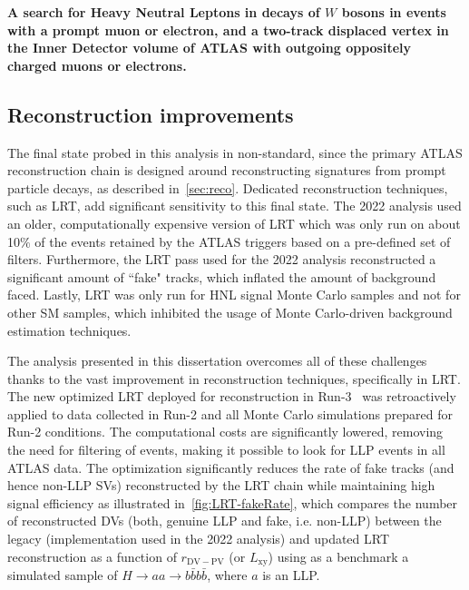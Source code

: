 \textbf{A search for Heavy Neutral Leptons in decays of $W$ bosons in events with a prompt muon or electron, and a two-track displaced vertex in the Inner Detector volume of ATLAS with outgoing oppositely charged muons or electrons.}

\subsection{Reconstruction improvements}
The final state probed in this analysis in non-standard, since the primary ATLAS reconstruction chain is designed around reconstructing signatures from prompt particle decays, as described in~\cref{sec:reco}. Dedicated reconstruction techniques, such as LRT, add significant sensitivity to this final state. The 2022 analysis used an older, computationally expensive version of LRT which was only run on about 10$\%$ of the events retained by the ATLAS triggers based on a pre-defined set of filters. Furthermore, the LRT pass used for the 2022 analysis reconstructed a significant amount of ``fake" tracks, which inflated the amount of background faced. Lastly, LRT was only run for HNL signal Monte Carlo samples and not for other SM samples, which inhibited the usage of Monte Carlo-driven background estimation techniques. 

The analysis presented in this dissertation overcomes all of these challenges thanks to the vast improvement in reconstruction techniques, specifically in LRT. The new optimized LRT deployed for reconstruction in Run-3~\cite{IDTR-2021-03} was retroactively applied to data collected in Run-2 and all Monte Carlo simulations prepared for Run-2 conditions. The computational costs are significantly lowered, removing the need for filtering of events, making it possible to look for LLP events in all ATLAS data. The optimization significantly reduces the rate of fake tracks (and hence non-LLP SVs) reconstructed by the LRT chain while maintaining high signal efficiency as illustrated in~\cref{fig:LRT-fakeRate}, which compares the number of reconstructed DVs (both, genuine LLP and fake, i.e. non-LLP) between the legacy (implementation used in the 2022 analysis) and updated LRT reconstruction as a function of $r_\mathrm{DV-PV}$ (or $L_\mathrm{xy}$) using as a benchmark a simulated sample of $H\rightarrow aa \rightarrow b\bar{b}b\bar{b}$, where $a$ is an LLP.

